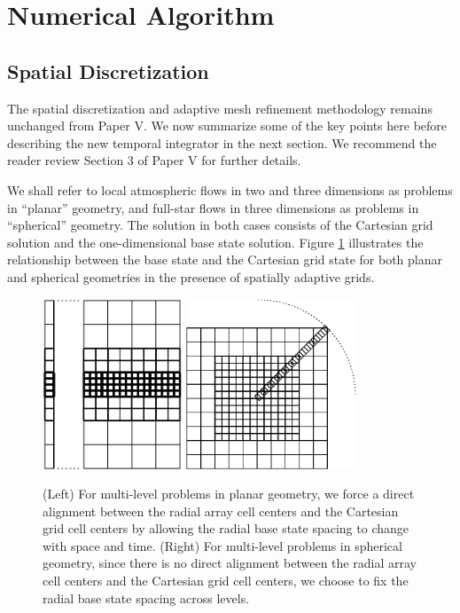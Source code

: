 \section{Numerical Algorithm}\label{eq:algorithm}

\subsection{Spatial Discretization}\label{Sec:Spatial}
The spatial discretization and adaptive mesh refinement methodology remains unchanged from Paper V.
We now summarize some of the key points here before describing the new temporal integrator in the next section.
We recommend the reader review Section 3 of Paper V for further details.

We shall refer to local atmospheric flows in two and three dimensions as problems in ``planar'' geometry, and full-star flows
in three dimensions as problems in ``spherical'' geometry. The solution in both cases consists of the Cartesian grid solution
and the one-dimensional base state solution.
Figure \ref{Fig:BaseGrid} illustrates the relationship between the base state and the Cartesian grid state for both planar and spherical geometries in the presence of spatially adaptive grids.
\begin{figure}[tb]
\centering
\includegraphics[height=2.0in]{./figs/base_grid} \hspace{0.5in}
\includegraphics[height=2.0in]{./figs/base_spherical}
\caption{\label{Fig:BaseGrid}  
(Left) For multi-level problems in planar geometry, we force a direct alignment
between the radial array cell centers and the Cartesian grid cell centers by 
allowing the radial base state spacing to change with space and time.
(Right) For multi-level problems in spherical geometry, since there is no direct alignment
between the radial array cell centers and the Cartesian grid cell centers, we choose to fix
the radial base state spacing across levels.}
\end{figure}
